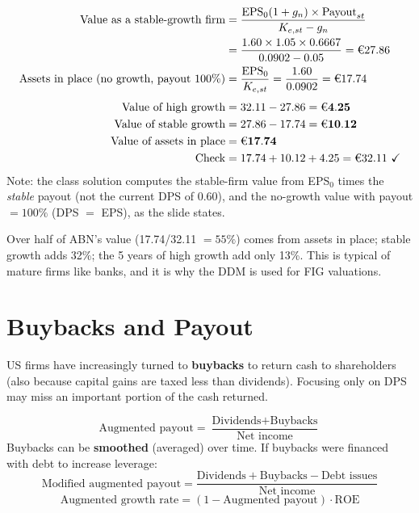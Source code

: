\begin{exbox}
\begin{align*}
\text{Value as a stable-growth firm}&=\frac{\text{EPS}_0(1+g_n)\times\text{Payout}_{st}}{K_{e,st}-g_n}\\&=\frac{1.60\times1.05\times0.6667}{0.0902-0.05}=\text{\euro}27.86\\
\text{Assets in place (no growth, payout 100\%)}&=\frac{\text{EPS}_0}{K_{e,st}}=\frac{1.60}{0.0902}=\text{\euro}17.74\\[3pt]
\text{Value of high growth}&=32.11-27.86=\mathbf{\text{\euro}4.25}\\
\text{Value of stable growth}&=27.86-17.74=\mathbf{\text{\euro}10.12}\\
\text{Value of assets in place}&=\mathbf{\text{\euro}17.74}\\
\text{Check}&=17.74+10.12+4.25=\text{\euro}32.11\ \checkmark
\end{align*}
\footnotesize Note: the class solution computes the stable-firm value from EPS$_0$ times the \emph{stable} payout (not the current DPS of 0.60), and the no-growth value with payout $=100\%$ (DPS $=$ EPS), as the slide states.
\end{exbox}
\begin{addbox}
Over half of ABN's value (17.74/32.11 $=55\%$) comes from assets in place; stable growth adds 32\%; the 5 years of high growth add only 13\%. This is typical of mature firms like banks, and it is why the DDM is used for FIG valuations.
\end{addbox}

\section{Buybacks and Payout}

US firms have increasingly turned to \textbf{buybacks} to return cash to shareholders (also because capital gains are taxed less than dividends). Focusing only on DPS may miss an important portion of the cash returned.
\begin{keybox}
\[
\text{Augmented payout}=\frac{\text{Dividends}+\text{Buybacks}}{\text{Net income}}
\]
Buybacks can be \textbf{smoothed} (averaged) over time. If buybacks were financed with debt to increase leverage:
\[
\text{Modified augmented payout}=\frac{\text{Dividends}+\text{Buybacks}-\text{Debt issues}}{\text{Net income}}
\]
\[
\text{Augmented growth rate}=(1-\text{Augmented payout})\cdot\text{ROE}
\]
\end{keybox}


